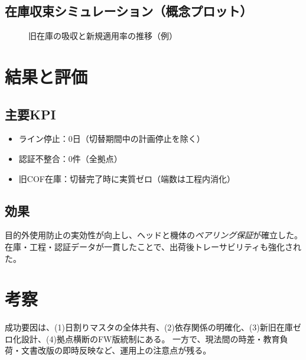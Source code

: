 \documentclass[journal,twocolumn]{IEEEtran}
\begin{document}
\subsection{在庫収束シミュレーション（概念プロット）}
\begin{figure}[t]
\centering
{}
\caption{旧在庫の吸収と新規適用率の推移（例）}
\label{fig:inventory}
\end{figure}

\section{結果と評価}
\subsection{主要KPI}
\begin{itemize}
  \item ライン停止：0日（切替期間中の計画停止を除く）
  \item 認証不整合：0件（全拠点）
  \item 旧COF在庫：切替完了時に実質ゼロ（端数は工程内消化）
\end{itemize}

\subsection{効果}
目的外使用防止の実効性が向上し、ヘッドと機体の\emph{ペアリング保証}が確立した。
在庫・工程・認証データが一貫したことで、出荷後トレーサビリティも強化された。

\section{考察}
成功要因は、(1)日割りマスタの全体共有、(2)依存関係の明確化、(3)新旧在庫ゼロ化設計、(4)拠点横断のFW版統制にある。
一方で、現法間の時差・教育負荷・文書改版の即時反映など、運用上の注意点が残る。
\end{document}
